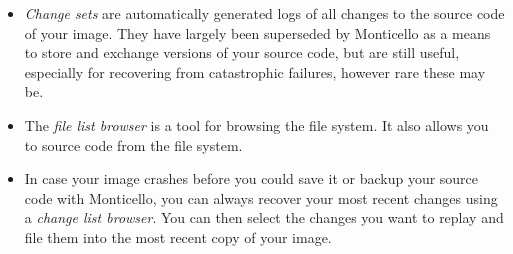 \documentclass[a4paper,10pt,twoside]{book}
\begin{document}
\begin{itemize}
  \item \emph{Change sets} are automatically generated logs of all changes to the source code of your image. They have largely been superseded by Monticello as a means to store and exchange versions of your source code, but are still useful, especially for recovering from catastrophic failures, however rare these may be.
  \item The \emph{file list browser} is a tool for browsing the file system. It also allows you to  source code from the file system.
  \item In case your image crashes before you could save it or backup your source code with Monticello, you can always recover your most recent changes using a \emph{change list browser}. You can then select the changes you want to replay and file them into the most recent copy of your image.
\end{itemize}

\ifx\wholebook\relax\else
\end{document}
